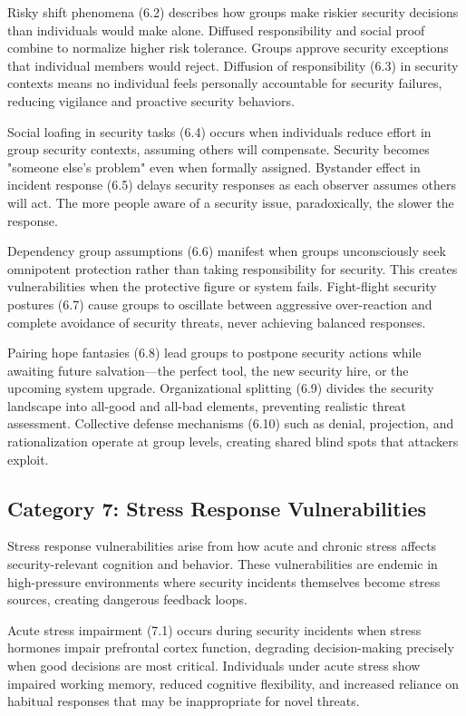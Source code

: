 \documentclass[11pt,a4paper]{article}
\begin{document}
Risky shift phenomena (6.2) describes how groups make riskier security decisions than individuals would make alone. Diffused responsibility and social proof combine to normalize higher risk tolerance. Groups approve security exceptions that individual members would reject. Diffusion of responsibility (6.3) in security contexts means no individual feels personally accountable for security failures, reducing vigilance and proactive security behaviors.

Social loafing in security tasks (6.4) occurs when individuals reduce effort in group security contexts, assuming others will compensate. Security becomes "someone else's problem" even when formally assigned. Bystander effect in incident response (6.5) delays security responses as each observer assumes others will act. The more people aware of a security issue, paradoxically, the slower the response.

Dependency group assumptions (6.6) manifest when groups unconsciously seek omnipotent protection rather than taking responsibility for security. This creates vulnerabilities when the protective figure or system fails. Fight-flight security postures (6.7) cause groups to oscillate between aggressive over-reaction and complete avoidance of security threats, never achieving balanced responses.

Pairing hope fantasies (6.8) lead groups to postpone security actions while awaiting future salvation—the perfect tool, the new security hire, or the upcoming system upgrade. Organizational splitting (6.9) divides the security landscape into all-good and all-bad elements, preventing realistic threat assessment. Collective defense mechanisms (6.10) such as denial, projection, and rationalization operate at group levels, creating shared blind spots that attackers exploit.

\subsection{Category 7: Stress Response Vulnerabilities}

Stress response vulnerabilities arise from how acute and chronic stress affects security-relevant cognition and behavior. These vulnerabilities are endemic in high-pressure environments where security incidents themselves become stress sources, creating dangerous feedback loops.

Acute stress impairment (7.1) occurs during security incidents when stress hormones impair prefrontal cortex function, degrading decision-making precisely when good decisions are most critical. Individuals under acute stress show impaired working memory, reduced cognitive flexibility, and increased reliance on habitual responses that may be inappropriate for novel threats.
\end{document}
